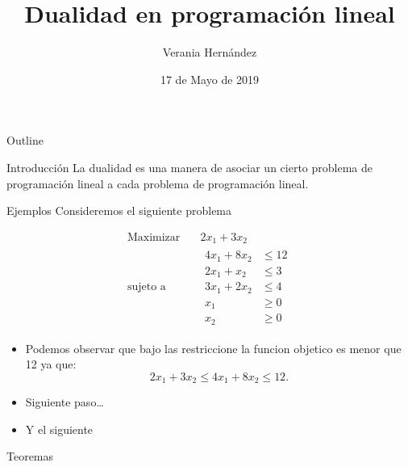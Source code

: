\documentclass[presentation]{beamer}
\author{Verania Hernández}
\date{17 de Mayo de 2019}
\title{Dualidad en programación lineal}
\begin{document}
\maketitle
\begin{frame}{Outline}
\tableofcontents
\end{frame}


\begin{frame}[label={sec:org974a816}]{Introducción}
La dualidad es una manera de asociar un cierto problema de
programación lineal a cada problema de programación lineal.
\end{frame}

\begin{frame}[label={sec:orge439a1a}]{Ejemplos}
Consideremos el siguiente problema

\begin{equation*}
 \begin{aligned}
 \text{Maximizar} \quad & 2x_{1}+3x_{2}\\
 \text{sujeto a} \quad &
   \begin{aligned}
    4x_{1}+8x_{2} &\leq 12\\
    2x_{1}+x_{2} &\leq 3\\
    3x_{1}+2x_{2} &\leq 4\\
    x_{1} &\geq  0\\
    x_{2} &\geq 0
   \end{aligned}
 \end{aligned}
 \end{equation*}
\begin{itemize}
\item Podemos observar que bajo las restriccione la funcion objetico es
menor que 12 ya que:
\begin{equation*}
2x_{1}+3x_{2}\leq 4x_{1}+8x_{2}\leq 12.
\end{equation*}
\item Siguiente paso\ldots{}
\item Y el siguiente
\end{itemize}
\end{frame}

\begin{frame}[label={sec:orgb3880af}]{Teoremas}
\end{frame}
\end{document}
